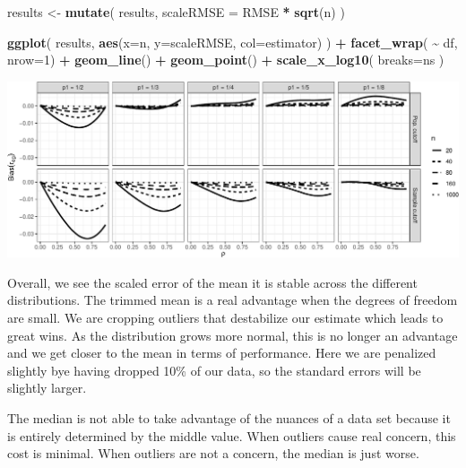 \documentclass[
]{book}
\newenvironment{Shaded}{\begin{snugshade}}{\end{snugshade}}
\newcommand{\AttributeTok}[1]{\textcolor[rgb]{0.13,0.29,0.53}{#1}}
\newcommand{\DecValTok}[1]{\textcolor[rgb]{0.00,0.00,0.81}{#1}}
\newcommand{\FunctionTok}[1]{\textcolor[rgb]{0.13,0.29,0.53}{\textbf{#1}}}
\newcommand{\NormalTok}[1]{#1}
\newcommand{\OtherTok}[1]{\textcolor[rgb]{0.56,0.35,0.01}{#1}}
\newcommand{\SpecialCharTok}[1]{\textcolor[rgb]{0.81,0.36,0.00}{\textbf{#1}}}
\begin{document}
\begin{Shaded}
\begin{Highlighting}[]
\NormalTok{results }\OtherTok{\textless{}{-}} \FunctionTok{mutate}\NormalTok{( results, }\AttributeTok{scaleRMSE =}\NormalTok{ RMSE }\SpecialCharTok{*} \FunctionTok{sqrt}\NormalTok{(n) )}
\end{Highlighting}
\end{Shaded}

\begin{Shaded}
\begin{Highlighting}[]
\FunctionTok{ggplot}\NormalTok{( results, }\FunctionTok{aes}\NormalTok{(}\AttributeTok{x=}\NormalTok{n, }\AttributeTok{y=}\NormalTok{scaleRMSE, }\AttributeTok{col=}\NormalTok{estimator) ) }\SpecialCharTok{+}
    \FunctionTok{facet\_wrap}\NormalTok{( }\SpecialCharTok{\textasciitilde{}}\NormalTok{ df, }\AttributeTok{nrow=}\DecValTok{1}\NormalTok{) }\SpecialCharTok{+}
    \FunctionTok{geom\_line}\NormalTok{() }\SpecialCharTok{+} \FunctionTok{geom\_point}\NormalTok{() }\SpecialCharTok{+}
    \FunctionTok{scale\_x\_log10}\NormalTok{( }\AttributeTok{breaks=}\NormalTok{ns )}
\end{Highlighting}
\end{Shaded}

\begin{center}\includegraphics[width=0.75\linewidth]{Designing-Simulations-in-R_files/figure-latex/unnamed-chunk-191-1} \end{center}

Overall, we see the scaled error of the mean it is stable across the
different distributions. The trimmed mean is a real advantage when the
degrees of freedom are small. We are cropping outliers that destabilize our
estimate which leads to great wins. As the distribution grows more normal,
this is no longer an advantage and we get closer to the mean in terms of
performance. Here we are penalized slightly bye having dropped 10\% of our
data, so the standard errors will be slightly larger.

The median is not able to take advantage of the nuances of a data set because
it is entirely determined by the middle value. When outliers cause real
concern, this cost is minimal. When outliers are not a concern, the median is
just worse.
\end{document}
